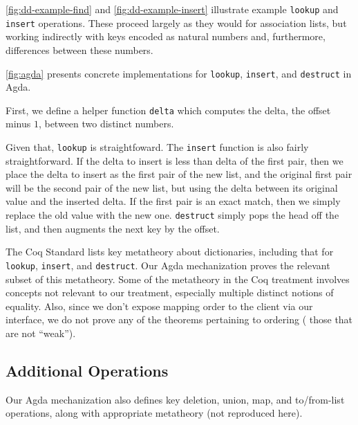 

\autoref{fig:dd-example-find} and \autoref{fig:dd-example-insert} illustrate example \texttt{lookup} and \texttt{insert} operations.
%
These proceed largely as they would for association lists, but working indirectly with keys encoded as natural numbers and, furthermore, differences between these numbers.

\autoref{fig:agda} presents concrete implementations for \texttt{lookup}, \texttt{insert}, and \texttt{destruct} in Agda.
%

First, we define a helper function \verb+delta+ which computes the delta, \ie{} the offset minus $1$, between two distinct numbers.

Given that, \verb+lookup+ is straightfoward. The \verb+insert+ function is also fairly straightforward.
%
If the delta to insert is less than delta of the first pair, then we place the delta to insert as the first pair of the new list, and
%
the original first pair will be the second pair of the new list, but using the delta between its original value and the inserted delta.
%
If the first pair is an exact match, then we simply replace the old value with the new one.
%
\verb+destruct+ simply pops the head off the list, and then augments the next key by the offset.

%
The Coq Standard \citet[Facts about weak maps]{FMapFacts} lists key metatheory about dictionaries, including that for \verb+lookup+, \verb+insert+, and \verb+destruct+.
%
Our Agda mechanization proves the relevant subset of this metatheory. Some of the metatheory in the Coq treatment involves concepts not relevant to our treatment,
%
especially multiple distinct notions of equality. Also, since we don't expose mapping order to the client via our interface,
%
we do not prove any of the theorems pertaining to ordering (\ie{} those that are not ``weak'').


\subsection{Additional Operations}

Our Agda mechanization also defines key deletion, union, map, and to/from-list operations, along
with appropriate metatheory (not reproduced here).



